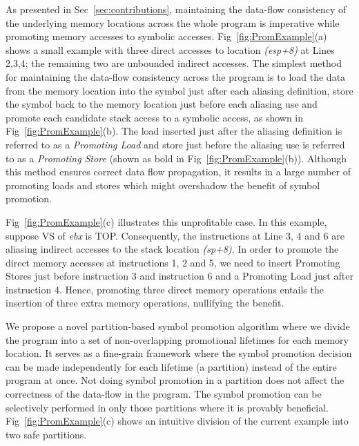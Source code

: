 As presented in Sec~\ref{sec:contributions}, maintaining the data-flow consistency of the underlying memory locations across the whole program is imperative while promoting memory accesses to symbolic accesses. Fig~\ref{fig:PromExample}(a) shows a small example with three direct accesses to location \emph{(esp+8)} at Lines 2,3,4; the remaining two are unbounded indirect accesses. The simplest method for maintaining the data-flow consistency across the program is to load the data from the memory location into the symbol just after each aliasing definition, store the symbol back to the memory location just before each aliasing use and promote each candidate stack access to a symbolic access, as shown in Fig~\ref{fig:PromExample}(b). The load inserted just after the aliasing definition is referred to as a \emph{Promoting Load} and store just before the aliasing use is referred to as a \emph{Promoting Store} (shown as bold in Fig~\ref{fig:PromExample}(b)). Although this method ensures correct data flow propagation, it results in a large number of promoting loads and stores which might overshadow the benefit of symbol promotion.


Fig~\ref{fig:PromExample}(c) illustrates this unprofitable case. In this example, suppose VS of \emph{ebx} is TOP. Consequently, the instructions at Line 3, 4 and 6 are aliasing indirect accesses to the stack location \emph{(sp+8)}. In order to promote the direct memory accesses at instructions 1, 2 and 5, we need to insert Promoting Stores just before instruction 3 and instruction 6 and a Promoting Load just after instruction 4. Hence, promoting three direct memory operations entails the insertion of three extra memory operations, nullifying the benefit. 

We propose a novel partition-based symbol promotion algorithm where we divide the program into a set of non-overlapping promotional lifetimes for each memory location. It serves as a fine-grain framework where the symbol promotion decision can be made independently for each lifetime (a partition) instead of the entire program at once. Not doing symbol promotion in a partition does not affect the correctness of the data-flow in the program. The symbol promotion can be selectively performed in only those partitions where it is provably beneficial. Fig~\ref{fig:PromExample}(c) shows an intuitive division of the current example into two safe partitions.

